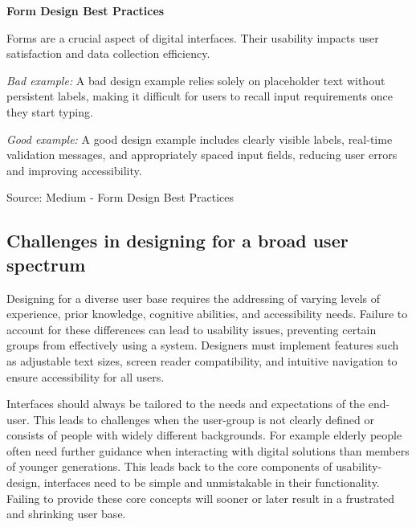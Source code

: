 \blankLine

\textbf{Form Design Best Practices}

Forms are a crucial aspect of digital interfaces. Their usability impacts user satisfaction and data collection efficiency.

\blankLine

\textit{Bad example:}
A bad design example relies solely on placeholder text without persistent labels, making it difficult for users to recall input requirements once they start typing.

\blankLine

\textit{Good example:}
A good design example includes clearly visible labels, real-time validation messages, and appropriately spaced input fields, reducing user errors and improving accessibility.

Source: Medium - Form Design Best Practices

\blankLine

\subsection{Challenges in designing for a broad user spectrum}

Designing for a diverse user base requires the addressing of varying levels of experience, prior knowledge, cognitive abilities, and accessibility needs. Failure to account for these differences can lead to usability issues, preventing certain groups from effectively using a system. Designers must implement features such as adjustable text sizes, screen reader compatibility, and intuitive navigation to ensure accessibility for all users.

\blankLine

Interfaces should always be tailored to the needs and expectations of the end-user. This leads to challenges when the user-group is not clearly defined or consists of people with widely different backgrounds. For example elderly people often need further guidance when interacting with digital solutions than members of younger generations. This leads back to the core components of usability-design, interfaces need to be simple and unmistakable in their functionality. Failing to provide these core concepts will sooner or later result in a frustrated and shrinking user base. 
\autocite{Paul:UIUXIntroduction}

\newpage